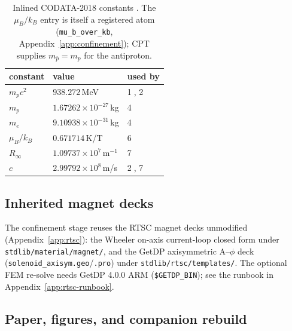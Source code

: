 \begin{table}[h]
\centering
\small
\begin{tabular}{@{}l l l@{}}
\toprule
\textbf{constant} & \textbf{value} & \textbf{used by} \\
\midrule
$m_p c^2$    & $938.272$\,MeV                       & \textcircled{\scriptsize 1}, \textcircled{\scriptsize 2} \\
$m_p$        & $1.67262\times10^{-27}$\,kg          & \textcircled{\scriptsize 4} \\
$m_e$        & $9.10938\times10^{-31}$\,kg          & \textcircled{\scriptsize 4} \\
$\mu_B/k_B$  & $0.671714$\,K/T                      & \textcircled{\scriptsize 6} \\
$R_\infty$   & $1.09737\times10^{7}\,\mathrm{m}^{-1}$ & \textcircled{\scriptsize 7} \\
$c$          & $2.99792\times10^{8}$\,m/s           & \textcircled{\scriptsize 2}, \textcircled{\scriptsize 7} \\
\bottomrule
\end{tabular}
\caption{Inlined CODATA-2018 constants \citep{mohr2018codata}. The
$\mu_B/k_B$ entry is itself a registered atom (\texttt{mu\_b\_over\_kb},
Appendix~\ref{app:confinement}); CPT supplies $m_{\bar p}=m_p$ for the
antiproton.}
\label{tab:repro-const}
\end{table}

\subsection{Inherited magnet decks}
\label{app:repro-decks}

The confinement stage reuses the RTSC magnet decks unmodified
(Appendix~\ref{app:rtsc}): the Wheeler on-axis current-loop closed form under
\texttt{stdlib/material/magnet/}, and the GetDP axisymmetric A--$\phi$ deck
(\texttt{solenoid\_axisym.geo}/\texttt{.pro}) under
\texttt{stdlib/rtsc/templates/}. The optional FEM re-solve needs GetDP 4.0.0
ARM (\texttt{\$GETDP\_BIN}); see the runbook in Appendix~\ref{app:rtsc-runbook}.

\subsection{Paper, figures, and companion rebuild}
\label{app:repro-paper}

